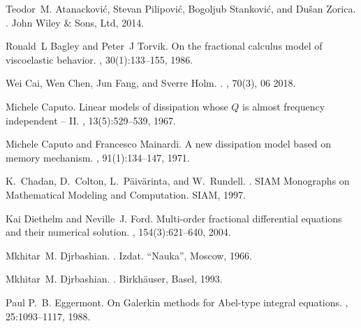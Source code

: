 \documentclass[12pt]{article}
\begin{document}
%
%
\begin{thebibliography}{10}

Teodor~M. Atanackovi\'{c}, Stevan Pilipovi\'{c}, Bogoljub Stankovi\'{c}, and
  Du\v{s}an Zorica.
.
\newblock John Wiley \& Sons, Ltd, 2014.

Ronald~L Bagley and Peter~J Torvik.
\newblock On the fractional calculus model of viscoelastic behavior.
, 30(1):133--155, 1986.

Wei Cai, Wen Chen, Jun Fang, and Sverre Holm.
.
, 70(3), 06 2018.

Michele Caputo.
\newblock Linear models of dissipation whose {$Q$} is almost frequency
  independent -- {II}.
, 13(5):529--539, 1967.

Michele Caputo and Francesco Mainardi.
\newblock A new dissipation model based on memory mechanism.
, 91(1):134--147, 1971.

K.~Chadan, D.~Colton, L.~P\"{a}iv\"{a}rinta, and W.~Rundell.
.
\newblock SIAM Monographs on Mathematical Modeling and Computation. SIAM, 1997.

Kai Diethelm and Neville~J. Ford.
\newblock Multi-order fractional differential equations and their numerical
  solution.
, 154(3):621--640, 2004.

Mkhitar~M. Djrbashian.
.
\newblock Izdat. ``Nauka'', Moscow, 1966.

Mkhitar~M. Djrbashian.
.
\newblock Birkh\"auser, Basel, 1993.

Paul P.~B. Eggermont.
\newblock On {G}alerkin methods for {A}bel-type integral equations.
, 25:1093--1117, 1988.


\end{thebibliography}
\end{document}
